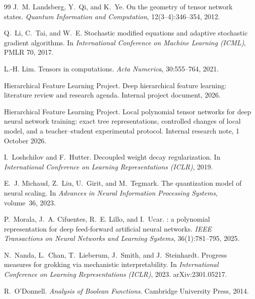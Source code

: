 \documentclass[11pt]{article}
\theoremstyle{definition}
\numberwithin{equation}{section}
\begin{document}
\begin{thebibliography}{99}
J.~M. Landsberg, Y.~Qi, and K.~Ye.
\newblock On the geometry of tensor network states.
\newblock \emph{Quantum Information and Computation}, 12(3--4):346--354, 2012.

Q.~Li, C.~Tai, and W.~E.
\newblock Stochastic modified equations and adaptive stochastic gradient algorithms.
\newblock In \emph{International Conference on Machine Learning (ICML)}, PMLR 70, 2017.

L.-H. Lim.
\newblock Tensors in computations.
\newblock \emph{Acta Numerica}, 30:555--764, 2021.

Hierarchical Feature Learning Project.
\newblock Deep hierarchical feature learning: literature review and research agenda.
\newblock Internal project document, 2026.

Hierarchical Feature Learning Project.
\newblock Local polynomial tensor networks for deep neural network training: exact tree representations, controlled changes of local model, and a teacher--student experimental protocol.
\newblock Internal research note, 1 October 2026.

I.~Loshchilov and F.~Hutter.
\newblock Decoupled weight decay regularization.
\newblock In \emph{International Conference on Learning Representations (ICLR)}, 2019.

E.~J. Michaud, Z.~Liu, U.~Girit, and M.~Tegmark.
\newblock The quantization model of neural scaling.
\newblock In \emph{Advances in Neural Information Processing Systems}, volume~36, 2023.

P.~Morala, J.~A. Cifuentes, R.~E. Lillo, and I.~Ucar.
: a polynomial representation for deep feed-forward artificial neural networks.
\newblock \emph{IEEE Transactions on Neural Networks and Learning Systems}, 36(1):781--795, 2025.

N.~Nanda, L.~Chan, T.~Lieberum, J.~Smith, and J.~Steinhardt.
\newblock Progress measures for grokking via mechanistic interpretability.
\newblock In \emph{International Conference on Learning Representations (ICLR)}, 2023. arXiv:2301.05217.

R.~O'Donnell.
\newblock \emph{Analysis of Boolean Functions}.
\newblock Cambridge University Press, 2014.


\end{thebibliography}
\end{document}
